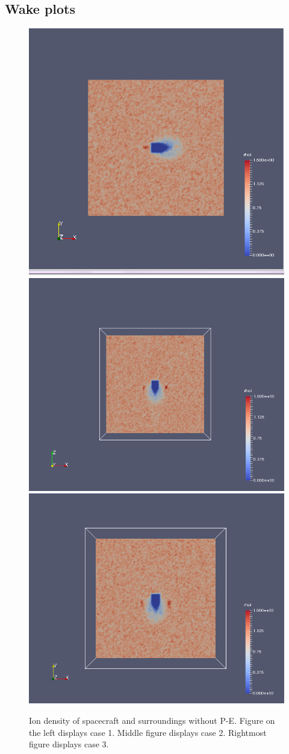     
    
\subsection{Wake plots}
    
    \begin{figure}
        \includegraphics[width = 0.3 \textwidth]{images/ion density case1}
        \includegraphics[width = 0.3 \textwidth]{images/ion density x-z case2}
	 \includegraphics[width = 0.3 \textwidth]{images/ion density x-y case3}
        \caption{Ion density of spacecraft and surroundings without P-E. Figure on the left displays case 1. Middle figure displays case 2. Rightmost figure displays case 3.}
    \end{figure}
